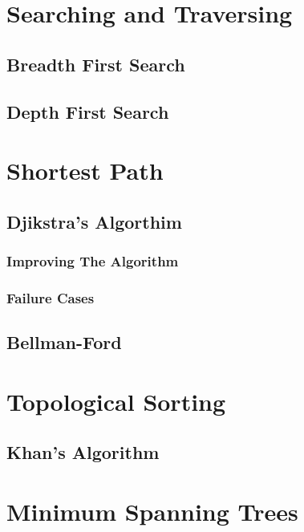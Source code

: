 \documentclass[10pt,a4paper]{book}
\begin{document}
\section{Searching and Traversing}

\subsection{Breadth First Search}

\subsection{Depth First Search}




\section{Shortest Path}

\subsection{Djikstra's Algorthim}

\subsubsection{Improving The Algorithm}

\subsubsection{Failure Cases}


\subsection{Bellman-Ford}



\section{Topological Sorting}

\subsection{Khan's Algorithm}

\section{Minimum Spanning Trees}
\end{document}
